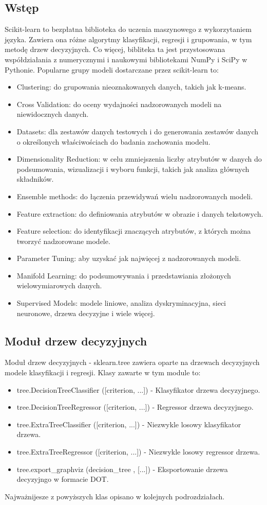 \documentclass[10pt,a4paper]{article}
\begin{document}
\subsection{Wstęp}
Scikit-learn to bezpłatna biblioteka do uczenia maszynowego z wykorzytaniem języka. Zawiera ona różne algorytmy klasyfikacji, regresji i grupowania, w tym metodę drzew decyzyjnych. Co więcej, bibliteka ta jest przystosowana współdziałania z numerycznymi i naukowymi bibliotekami NumPy i SciPy w Pythonie. Popularne grupy modeli dostarczane przez scikit-learn to:
\begin{itemize}
	\item Clustering: do grupowania nieoznakowanych danych, takich jak k-means.
	\item Cross Validation: do oceny wydajności nadzorowanych modeli na niewidocznych danych.
	\item Datasets: dla zestawów danych testowych i do generowania zestawów danych o określonych właściwościach do badania zachowania modelu.
	\item Dimensionality Reduction: w celu zmniejszenia liczby atrybutów w danych do podsumowania, wizualizacji i wyboru funkcji, takich jak analiza głównych składników.
	\item Ensemble methods: do łączenia przewidywań wielu nadzorowanych modeli.
	\item Feature extraction: do definiowania atrybutów w obrazie i danych tekstowych.
	\item Feature selection: do identyfikacji znaczących atrybutów, z których można tworzyć nadzorowane modele.
	\item Parameter Tuning: aby uzyskać jak najwięcej z nadzorowanych modeli.
	\item Manifold Learning: do podsumowywania i przedstawiania złożonych wielowymiarowych danych.
	\item Supervised Models: modele liniowe, analiza dyskryminacyjna, sieci neuronowe, drzewa decyzyjne i wiele więcej.
\end{itemize}

\subsection{Moduł drzew decyzyjnych}
Moduł drzew decyzyjnych - sklearn.tree zawiera oparte na drzewach decyzyjnych modele klasyfikacji i regresji. Klasy zawarte w tym module to:
\begin{itemize}
	\item tree.DecisionTreeClassifier ([criterion, ...]) - Klasyfikator drzewa decyzyjnego.
	\item tree.DecisionTreeRegressor ([criterion, ...]) - Regressor drzewa decyzyjnego.
	\item tree.ExtraTreeClassifier ([criterion, ...]) - Niezwykle losowy klasyfikator drzewa.
	\item tree.ExtraTreeRegressor ([criterion, ...]) - Niezwykle losowy regressor drzewa.
	\item tree.export\_graphviz (decision\_tree , [...]) - Eksportowanie drzewa decyzyjngo w formacie DOT.
\end{itemize}
Najważnijesze z powyższych klas opisano w kolejnych podrozdziałach.
\end{document}
